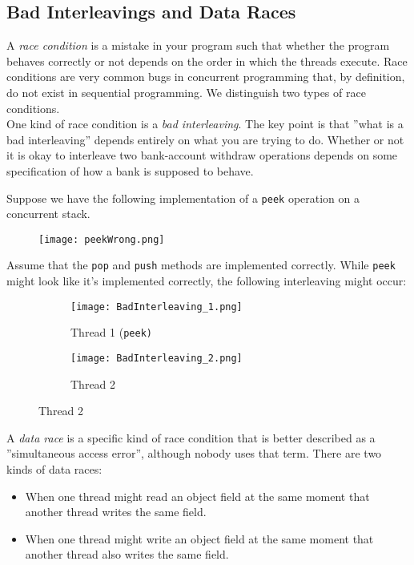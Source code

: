 \documentclass[main]{subfiles}
\begin{document}
\subsection{Bad Interleavings and Data Races}
A \textit{race condition} is a mistake in your program such that whether the program behaves correctly or not depends on the order in which the threads execute. Race conditions are very common bugs in concurrent programming that, by definition, do not exist in sequential programming. We distinguish two types of race conditions.\\[3mm]
One kind of race condition is a \textit{bad interleaving}. The key point is that ''what is a bad interleaving'' depends entirely on what you are trying to do. Whether or not it is okay to interleave two bank-account withdraw operations depends on some specification of how a bank is supposed to behave.
\begin{example}
    Suppose we have the following implementation of a \texttt{peek} operation on a concurrent stack.
    \begin{figure}[H]
        \centering
        \texttt{[image: peekWrong.png]}
    \end{figure}
    \noindent Assume that the \texttt{pop} and \texttt{push} methods are implemented correctly. While \texttt{peek} might look like it's implemented correctly, the following interleaving might occur:
    \begin{figure}[H]
        \centering
        \begin{subfigure}{.5\textwidth}
            \centering
            \texttt{[image: BadInterleaving\_1.png]}
            \captionsetup{labelformat=empty}
            \caption{Thread 1 (\texttt{peek)}}
        \end{subfigure}%
        \begin{subfigure}{.5\textwidth}
            \centering
            \texttt{[image: BadInterleaving\_2.png]}
            \captionsetup{labelformat=empty}
            \caption{Thread 2}
        \end{subfigure}
    \end{figure}
\end{example}
A \textit{data race} is a specific kind of race condition that is better described as a ''simultaneous access error'', although nobody uses that term. There are two kinds of data races:
\begin{itemize}
    \item When one thread might read an object field at the same moment that another thread writes the same field.
    \item When one thread might write an object field at the same moment that another thread also writes the same field.
\end{itemize}
\end{document}

